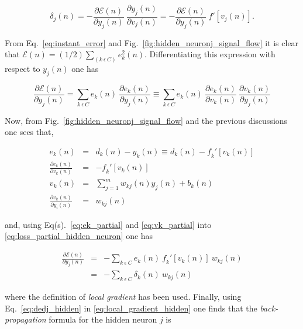 \begin{equation}
\label{eq:local_gradient_hidden}
\delta_{j}(n) = - \frac{\partial \mathcal{E}(n)}{\partial y_{j}(n)} ~ \frac{\partial y_{j}(n)}{\partial v_{j}(n)} = - \frac{\partial \mathcal{E}(n)}{\partial y_{j}(n)} ~ \mathit{f}'[v_{j}(n)].
\end{equation}

From Eq.~\ref{eq:instant_error} and Fig.~\ref{fig:hidden_neuronj_signal_flow} it is clear that $\mathcal{E}(n) = (1/2) \sum_{(k~\epsilon~C)} e_{k}^{2}(n)$. Differentiating this expression with respect to $y_{j}(n)$ one has

\begin{equation}
\label{eq:loss_partial_hidden_neuron}
\frac{\partial \mathcal{E}(n)}{\partial y_{j}(n)} = \sum_{k~\epsilon~C} e_{k}(n) ~ \frac{\partial e_{k}(n)}{\partial y_{j}(n)} \equiv \sum_{k~\epsilon~C} e_{k}(n) ~ \frac{\partial e_{k}(n)}{\partial v_{k}(n)} ~ \frac{\partial v_{k}(n)}{\partial y_{j}(n)}
\end{equation}

Now, from Fig.~\ref{fig:hidden_neuronj_signal_flow} and the previous discussions one sees that,

\begin{eqnarray}
e_{k}(n) &=& d_{k}(n) - y_{k}(n) \equiv d_{k}(n) - \mathit{f}_{k}'[v_{k}(n)] \\
\label{eq:ek_partial}
\frac{\partial e_{k}(n)}{\partial v_{k}(n)} &=& -\mathit{f}_{k}'[v_{k}(n)]\\
v_{k}(n) &=& \sum_{j=1}^{m} w_{kj}(n) y_{j}(n) + b_{k}(n)\\
\label{eq:vk_partial}
\frac{\partial v_{k}(n)}{\partial y_{i}(n)} &=& w_{kj}(n)
\end{eqnarray}

and, using Eq(s).~\ref{eq:ek_partial} and \ref{eq:vk_partial} into \ref{eq:loss_partial_hidden_neuron} one has

\begin{eqnarray}
\label{eq:dedj_hidden}
\nonumber
\frac{\partial \mathcal{E}(n)}{\partial y_{j}(n)} &=& - \sum_{k~\epsilon~C} e_{k}(n) ~ \mathit{f}_{k}'[v_{k}(n)] ~ w_{kj}(n)\\
                                                  &=& - \sum_{k~\epsilon~C} \delta_{k}(n) ~ w_{kj}(n)
\end{eqnarray}

where the definition of \textit{local gradient} has been used. Finally, using Eq.~\ref{eq:dedj_hidden} in \ref{eq:local_gradient_hidden} one finds that the \textit{back-propagation} formula for the hidden neuron $j$ is

